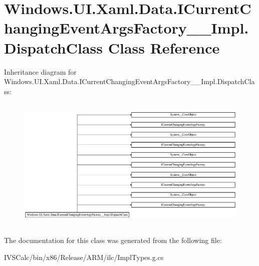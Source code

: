 \hypertarget{class_windows_1_1_u_i_1_1_xaml_1_1_data_1_1_i_current_changing_event_args_factory_____impl_1_1_dispatch_class}{}\section{Windows.\+U\+I.\+Xaml.\+Data.\+I\+Current\+Changing\+Event\+Args\+Factory\+\_\+\+\_\+\+Impl.\+Dispatch\+Class Class Reference}
\label{class_windows_1_1_u_i_1_1_xaml_1_1_data_1_1_i_current_changing_event_args_factory_____impl_1_1_dispatch_class}
Inheritance diagram for Windows.\+U\+I.\+Xaml.\+Data.\+I\+Current\+Changing\+Event\+Args\+Factory\+\_\+\+\_\+\+Impl.\+Dispatch\+Class\+:\begin{figure}[H]
\begin{center}
\leavevmode
\includegraphics[height=6.497890cm]{class_windows_1_1_u_i_1_1_xaml_1_1_data_1_1_i_current_changing_event_args_factory_____impl_1_1_dispatch_class}
\end{center}
\end{figure}


The documentation for this class was generated from the following file\+:\begin{DoxyCompactItemize}
\item 
I\+V\+S\+Calc/bin/x86/\+Release/\+A\+R\+M/ilc/Impl\+Types.\+g.\+cs\end{DoxyCompactItemize}
